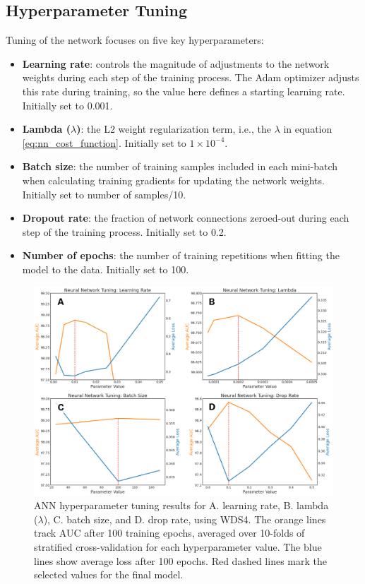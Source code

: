 \subsection{Hyperparameter Tuning}\label{ch5:ann_tuning}
Tuning of the network focuses on five key hyperparameters:
\begin{itemize}[itemsep=2pt]
    \item \textbf{Learning rate}: controls the magnitude of adjustments to the network weights during each step of the training process. The Adam optimizer adjusts this rate during training, so the value here defines a starting learning rate. Initially set to 0.001.
    \item \textbf{Lambda ($\lambda$)}: the L2 weight regularization term, i.e., the $\lambda$ in equation \ref{eq:nn_cost_function}. Initially set to $1\times10^{-4}$.
    \item \textbf{Batch size}: the number of training samples included in each mini-batch when calculating training gradients for updating the network weights. Initially set to number of samples/10.
    \item \textbf{Dropout rate}: the fraction of network connections zeroed-out during each step of the training process. Initially set to 0.2.
    \item \textbf{Number of epochs}: the number of training repetitions when fitting the model to the data. Initially set to 100.
\end{itemize}
\begin{figure}[htp]
\centering
\includegraphics[width=\textwidth]{templates/images/Figure-NN_Hyperparameters.png}
\caption[Neural network hyperparameter tuning]{ANN hyperparameter tuning results for A. learning rate, B. lambda ($\lambda$), C. batch size, and D. drop rate, using WDS4. The orange lines track AUC after 100 training epochs, averaged over 10-folds of stratified cross-validation for each hyperparameter value. The blue lines show average loss after 100 epochs. Red dashed lines mark the selected values for the final model.}
\label{fig:nn_tuning_plots}
\end{figure}

